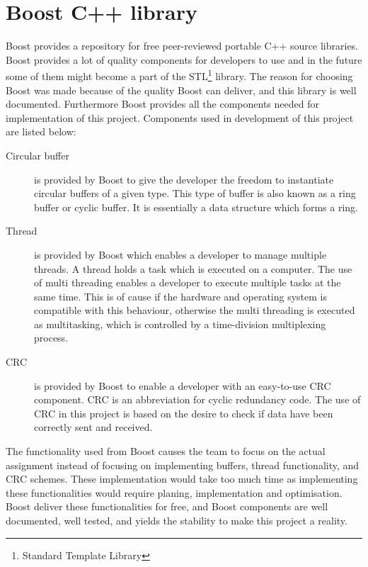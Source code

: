 \chapter{Boost C++ library}\label{app:boost}
Boost provides a repository for free peer-reviewed portable C++ source libraries. Boost provides a lot of quality components for developers to use and in the future some of them might become a part of the STL\footnote{Standard Template Library} library. The reason for choosing Boost was made because of the quality Boost can deliver, and this library is well documented. Furthermore Boost provides all the components needed for implementation of this project. Components used in development of this project are listed below:

\begin{description}
\item[Circular buffer]
is provided by Boost to give the developer the freedom to instantiate circular buffers of a given type. This type of buffer is also known as a ring buffer or cyclic buffer. It is essentially a data structure which forms a ring. 

\item[Thread]
is provided by Boost which enables a developer to manage multiple threads. A thread holds a task which is executed on a computer. The use of multi threading enables a developer to execute multiple tasks at the same time. This is of cause if the hardware and operating system is compatible with this behaviour, otherwise the multi threading is executed as multitasking, which is controlled by a time-division multiplexing process.

\item[CRC]
is provided by Boost to enable a developer with an easy-to-use CRC component. CRC is an abbreviation for cyclic redundancy code. The use of CRC in this project is based on the desire to check if data have been correctly sent and received.
\end{description}

The functionality used from Boost causes the team to focus on the actual assignment instead of focusing on implementing buffers, thread functionality, and CRC schemes. These implementation would take too much time as implementing these functionalities would require planing, implementation and optimisation. Boost deliver these functionalities for free, and Boost components are well documented, well tested, and yields the stability to make this project a reality.